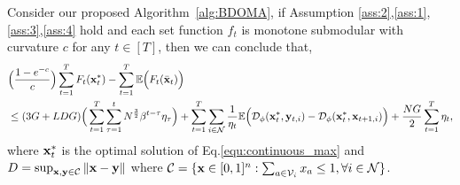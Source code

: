 	\begin{lemma}\label{lemma:4} 
			Consider our proposed Algorithm~\ref{alg:BDOMA}, if Assumption \ref{ass:2},\ref{ass:1},\ref{ass:3},\ref{ass:4} hold and each set function $f_{t}$ is monotone submodular with curvature $c$ for any $t\in[T]$, then we can conclude that,
		\begin{equation*}
			\begin{aligned}
				&\Big(\frac{1-e^{-c}}{c}\Big)\sum_{t=1}^{T}F_{t}(\mathbf{x}^{*}_{t})-\sum_{t=1}^{T}\mathbb{E}\Big(F_{t}(\bar{\mathbf{x}}_{t})\Big)\\
				&\le(3G+LDG)\Big(\sum_{t=1}^{T}\sum_{\tau=1}^{t}N^{\frac{3}{2}}\beta^{t-\tau}\eta_{\tau}\Big)+\sum_{t=1}^{T}\sum_{i\in\mathcal{N}}\frac{1}{\eta_{t}}\mathbb{E}\Big(\mathcal{D}_{\phi}(\mathbf{x}^{*}_{t},\mathbf{y}_{t,i})-\mathcal{D}_{\phi}(\mathbf{x}^{*}_{t},\mathbf{x}_{t+1,i})\Big)+\frac{NG}{2}\sum_{t=1}^{T}\eta_{t},
			\end{aligned}
		\end{equation*} where $\mathbf{x}_{t}^{*}$ is the optimal solution of Eq.\eqref{equ:continuous_max} and $D=\sup_{\mathbf{x},\mathbf{y}\in\mathcal{C}}\|\mathbf{x}-\mathbf{y}\|$ where $\mathcal{C}=\{\mathbf{x}\in[0,1]^{n}: \sum_{a\in\mathcal{V}_{i}}x_{a}\le1,\forall i\in\mathcal{N}\}$.
	\end{lemma}
